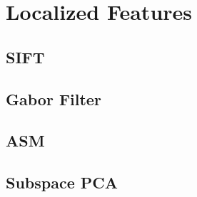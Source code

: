 \chapter{Localized Features}

\section{SIFT}

\section{Gabor Filter}

\section{ASM}

\section{Subspace PCA}